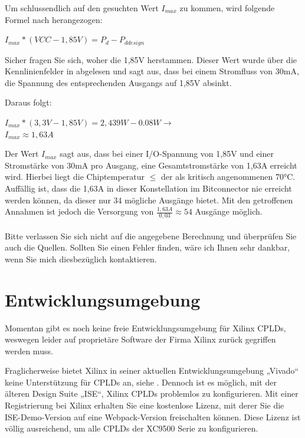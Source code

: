 \documentclass{article}
\begin{document}
Um schlussendlich auf den gesuchten Wert $I_{max}$ zu kommen, wird folgende Formel nach \autocite[16]{XC95_maxI} herangezogen:

\begin{center}
	$I_{max} * (VCC - 1,85V) = P_d - P_{ddesign}$
\end{center}

Sicher fragen Sie sich, woher die 1,85V herstammen. Dieser Wert wurde über die Kennlinienfelder in \autocite[6]{XC_Curves} abgelesen und sagt aus, dass bei einem Stromfluss von 30mA, die Spannung des entsprechenden Ausgangs auf 1,85V absinkt.

Daraus folgt: 
\begin{center}
	$I_{max} * (3,3V - 1,85V) = 2,439 W - 0.08W \rightarrow$\\
	\underline{\underline{$I_{max}\approx 1,63A $}}
\end{center}
Der Wert $I_{max}$ sagt aus, dass bei einer I/O-Spannung von 1,85V und einer Stromstärke von 30mA pro Ausgang, eine Gesamtstromstärke von 1,63A erreicht wird. Hierbei liegt die Chiptemperatur $\leq $ der als kritisch angenommenen 70$\si{\celsius}$. Auffällig ist, dass die 1,63A in dieser Konstellation im Bitconnector nie erreicht werden können, da dieser nur 34 mögliche Ausgänge bietet. Mit den getroffenen Annahmen ist jedoch die Versorgung von $\frac{1,63A}{0,03}\approx54$ Ausgänge möglich.\\\\
Bitte verlassen Sie sich nicht auf die angegebene Berechnung und überprüfen Sie auch die Quellen. Sollten Sie einen Fehler finden, wäre ich Ihnen sehr dankbar, wenn Sie mich diesbezüglich kontaktieren.

\section{Entwicklungsumgebung}

Momentan gibt es noch keine freie \autocite{FSF} Entwicklungsumgebung für Xilinx CPLDs, weswegen leider auf proprietäre Software der Firma Xilinx zurück gegriffen werden muss.
 
Fraglicherweise bietet Xilinx in seiner aktuellen Entwicklungsumgebung „Vivado“ keine Unterstützung für CPLDs an, siehe \autocite[17]{Vivado}. Dennoch ist es möglich, mit der älteren Design Suite „ISE“, Xilinx CPLDs problemlos zu konfigurieren.
Mit einer Registrierung bei Xilinx erhalten Sie eine kostenlose Lizenz, mit derer Sie die ISE-Demo-Version auf eine Webpack-Version \autocite{ISE-Web} freischalten können. Diese Lizenz ist völlig ausreichend, um alle CPLDs der XC9500 Serie zu konfigurieren.
\end{document}
